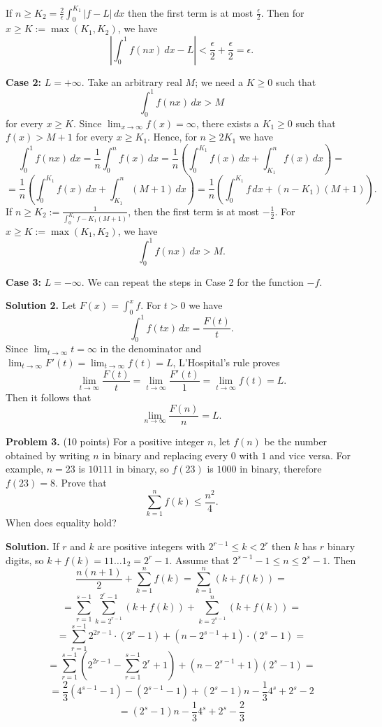 \documentclass{article}
\begin{document}
If $n \geq K_2 = \frac{2}{\epsilon} \int_0^{K_1} |f - L| \, dx$ then the first term is at most $\frac{\epsilon}{2}$. Then for $x \geq K := \max(K_1, K_2)$, we have
\[
\left| \int_0^1 f(nx) \, dx - L \right| < \frac{\epsilon}{2} + \frac{\epsilon}{2} = \epsilon.
\]


\textbf{Case 2:} $L = +\infty$. Take an arbitrary real $M$; we need a $K \geq 0$ such that
\[
\int_0^1 f(nx) \, dx > M
\]
for every $x \geq K$. Since $\lim_{x \to \infty} f(x) = \infty$, there exists a $K_1 \geq 0$ such that $f(x) > M + 1$ for every $x \geq K_1$. Hence, for $n \geq 2K_1$ we have
\[
\int_0^1 f(nx) \, dx = \frac{1}{n} \int_0^n f(x) \, dx = \frac{1}{n} \left( \int_0^{K_1} f(x) \, dx + \int_{K_1}^n f(x) \, dx \right) =
\]
\[
= \frac{1}{n} \left( \int_0^{K_1} f(x) \, dx + \int_{K_1}^n (M + 1) \, dx \right) = \frac{1}{n} \left( \int_0^{K_1} f \, dx + (n - K_1)(M + 1) \right).
\]
If $n \geq K_2 := \frac{1}{\int_0^{K_1} f - K_1(M + 1)}$, then the first term is at most $-\frac{1}{2}$. For $x \geq K := \max(K_1, K_2)$, we have
\[
\int_0^1 f(nx) \, dx > M.
\]

\textbf{Case 3:} $L = -\infty$. We can repeat the steps in Case 2 for the function $-f$.


\textbf{Solution 2.} Let $F(x) = \int_0^x f$. For $t > 0$ we have
\[
\int_0^1 f(tx) \, dx = \frac{F(t)}{t}.
\]
Since $\lim_{t \to \infty} t = \infty$ in the denominator and $\lim_{t \to \infty} F'(t) = \lim_{t \to \infty} f(t) = L$, L'Hospital's rule proves
\[
\lim_{t \to \infty} \frac{F(t)}{t} = \lim_{t \to \infty} \frac{F'(t)}{1} = \lim_{t \to \infty} f(t) = L.
\]
Then it follows that
\[
\lim_{n \to \infty} \frac{F(n)}{n} = L.
\]

\textbf{Problem 3.} (10 points)
For a positive integer \( n \),
let \( f(n) \) be the number obtained by writing \( n \) in binary and replacing every \( 0 \) with \( 1 \) and vice versa. For example, \( n = 23 \) is \( 10111 \) in binary, so \( f(23) \) is \( 1000 \) in binary, therefore \( f(23) = 8 \). Prove that
\[
\sum_{k=1}^n f(k) \leq \frac{n^2}{4}.
\]
When does equality hold?


\textbf{Solution.}
If \( r \) and \( k \) are positive integers with \( 2^{r-1}
\leq k < 2^r \) then \( k \) has \( r \) binary digits,
so \( k + f(k) = 11\ldots1_2 = 2^r - 1 \). Assume that \( 2^{s-1} - 1 \leq n \leq 2^s - 1 \). Then
\[
\frac{n(n+1)}{2} + \sum_{k=1}^n f(k) = \sum_{k=1}^n (k + f(k)) =
\]
\[
= \sum_{r=1}^{s-1} \sum_{k=2^{r-1}}^{2^r-1} (k + f(k)) + \sum_{k=2^{s-1}}^n (k + f(k)) =
\]
\[
= \sum_{r=1}^{s-1} 2^{2r-1} \cdot (2^r - 1) + (n - 2^{s-1} + 1) \cdot (2^s - 1) =
\]
\[
= \sum_{r=1}^{s-1} \left(2^{2r-1} - \sum_{r=1}^{s-1} 2^r + 1\right) + (n - 2^{s-1} + 1)(2^s - 1) =
\]
\[
= \frac{2}{3} (4^{s-1} - 1) - (2^{s-1} - 1) + (2^s - 1)n - \frac{1}{3}4^s + 2^s - 2
\]
\[
= (2^s - 1)n - \frac{1}{3}4^s + 2^s - \frac{2}{3}
\]
\end{document}
